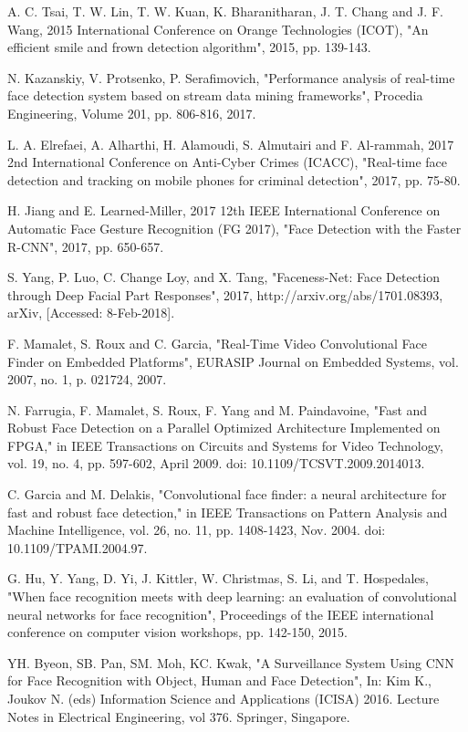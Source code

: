 \documentclass[conference]{IEEEtran}
\begin{document}
\begin{thebibliography}{00}
A. C. Tsai, T. W. Lin, T. W. Kuan, K. Bharanitharan, J. T. Chang and J. F. Wang, 2015 International Conference on Orange Technologies (ICOT), "An efficient smile and frown detection algorithm", 2015, pp. 139-143.

N. Kazanskiy, V. Protsenko, P. Serafimovich, "Performance analysis of real-time face detection system based on stream data mining frameworks", Procedia Engineering, Volume 201, pp. 806-816, 2017.

L. A. Elrefaei, A. Alharthi, H. Alamoudi, S. Almutairi and F. Al-rammah, 2017 2nd International Conference on Anti-Cyber Crimes (ICACC), "Real-time face detection and tracking on mobile phones for criminal detection", 2017, pp. 75-80.

H. Jiang and E. Learned-Miller, 2017 12th IEEE International Conference on Automatic Face Gesture Recognition (FG 2017), "Face Detection with the Faster R-CNN", 2017, pp. 650-657.

S. Yang, P. Luo, C. Change Loy, and X. Tang, "Faceness-Net: Face Detection through Deep Facial Part Responses", 2017, http://arxiv.org/abs/1701.08393, arXiv, [Accessed: 8-Feb-2018].

 F. Mamalet, S. Roux and C. Garcia, "Real-Time Video Convolutional Face Finder on Embedded Platforms", EURASIP Journal on Embedded Systems, vol. 2007, no. 1, p. 021724, 2007.

 N. Farrugia, F. Mamalet, S. Roux, F. Yang and M. Paindavoine, "Fast and Robust Face Detection on a Parallel Optimized Architecture Implemented on FPGA," in IEEE Transactions on Circuits and Systems for Video Technology, vol. 19, no. 4, pp. 597-602, April 2009.
doi: 10.1109/TCSVT.2009.2014013.

 C. Garcia and M. Delakis, "Convolutional face finder: a neural architecture for fast and robust face detection," in IEEE Transactions on Pattern Analysis and Machine Intelligence, vol. 26, no. 11, pp. 1408-1423, Nov. 2004.
doi: 10.1109/TPAMI.2004.97.

G. Hu, Y. Yang, D. Yi, J. Kittler, W. Christmas, S. Li, and T. Hospedales, "When face recognition meets with deep learning: an evaluation of convolutional neural networks for face recognition", Proceedings of the IEEE international conference on computer vision workshops, pp. 142-150, 2015.

YH. Byeon, SB. Pan, SM. Moh, KC. Kwak, "A Surveillance System Using CNN for Face Recognition with Object, Human and Face Detection", In: Kim K., Joukov N. (eds) Information Science and Applications (ICISA) 2016. Lecture Notes in Electrical Engineering, vol 376. Springer, Singapore.


\end{thebibliography}
\end{document}
